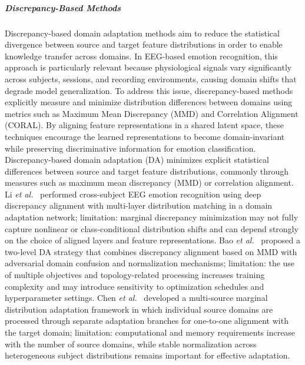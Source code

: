 \documentclass{WileyMSP-template}
\begin{document}
\subparagraph{Discrepancy-Based Methods}
Discrepancy-based domain adaptation methods aim to reduce the statistical divergence between source and target feature distributions in order to enable knowledge transfer across domains. In EEG-based emotion recognition, this approach is particularly relevant because physiological signals vary significantly across subjects, sessions, and recording environments, causing domain shifts that degrade model generalization. To address this issue, discrepancy-based methods explicitly measure and minimize distribution differences between domains using metrics such as Maximum Mean Discrepancy (MMD) and Correlation Alignment (CORAL). By aligning feature representations in a shared latent space, these techniques encourage the learned representations to become domain-invariant while preserving discriminative information for emotion classification.
Discrepancy-based domain adaptation (DA) minimizes explicit statistical differences between source and target feature distributions, commonly through measures such as maximum mean discrepancy (MMD) or correlation alignment. Li \textit{et al.}~\cite{li2018iconip_dan} performed cross-subject EEG emotion recognition using deep discrepancy alignment with multi-layer distribution matching in a domain adaptation network; limitation: marginal discrepancy minimization may not fully capture nonlinear or class-conditional distribution shifts and can depend strongly on the choice of aligned layers and feature representations. Bao \textit{et al.}~\cite{bao2021frontiers_tdann} proposed a two-level DA strategy that combines discrepancy alignment based on MMD with adversarial domain confusion and normalization mechanisms; limitation: the use of multiple objectives and topology-related processing increases training complexity and may introduce sensitivity to optimization schedules and hyperparameter settings. Chen \textit{et al.}~\cite{chen2021frontiers_msmda} developed a multi-source marginal distribution adaptation framework in which individual source domains are processed through separate adaptation branches for one-to-one alignment with the target domain; limitation: computational and memory requirements increase with the number of source domains, while stable normalization across heterogeneous subject distributions remains important for effective adaptation.
\end{document}
